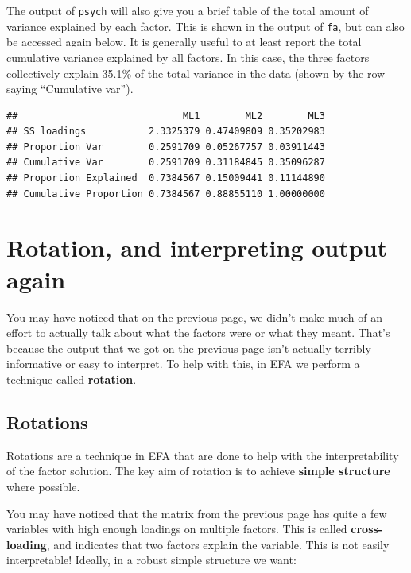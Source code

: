 \documentclass[
]{book}
\newenvironment{Shaded}{\begin{snugshade}}{\end{snugshade}}
\newcommand{\NormalTok}[1]{#1}
\newcommand{\SpecialCharTok}[1]{\textcolor[rgb]{0.81,0.36,0.00}{\textbf{#1}}}
\begin{document}
The output of \texttt{psych} will also give you a brief table of the total amount of variance explained by each factor. This is shown in the output of \texttt{fa}, but can also be accessed again below. It is generally useful to at least report the total cumulative variance explained by all factors. In this case, the three factors collectively explain 35.1\% of the total variance in the data (shown by the row saying ``Cumulative var'').

\begin{Shaded}
\end{Shaded}

\begin{verbatim}
##                             ML1        ML2        ML3
## SS loadings           2.3325379 0.47409809 0.35202983
## Proportion Var        0.2591709 0.05267757 0.03911443
## Cumulative Var        0.2591709 0.31184845 0.35096287
## Proportion Explained  0.7384567 0.15009441 0.11144890
## Cumulative Proportion 0.7384567 0.88855110 1.00000000
\end{verbatim}

\hypertarget{rotation-and-interpreting-output-again}{%
\section{Rotation, and interpreting output again}\label{rotation-and-interpreting-output-again}}

You may have noticed that on the previous page, we didn't make much of an effort to actually talk about what the factors were or what they meant. That's because the output that we got on the previous page isn't actually terribly informative or easy to interpret. To help with this, in EFA we perform a technique called \textbf{rotation}.

\hypertarget{rotations}{%
\subsection{Rotations}\label{rotations}}

Rotations are a technique in EFA that are done to help with the interpretability of the factor solution. The key aim of rotation is to achieve \textbf{simple structure} where possible.

You may have noticed that the matrix from the previous page has quite a few variables with high enough loadings on multiple factors. This is called \textbf{cross-loading}, and indicates that two factors explain the variable. This is not easily interpretable! Ideally, in a robust simple structure we want:
\end{document}
